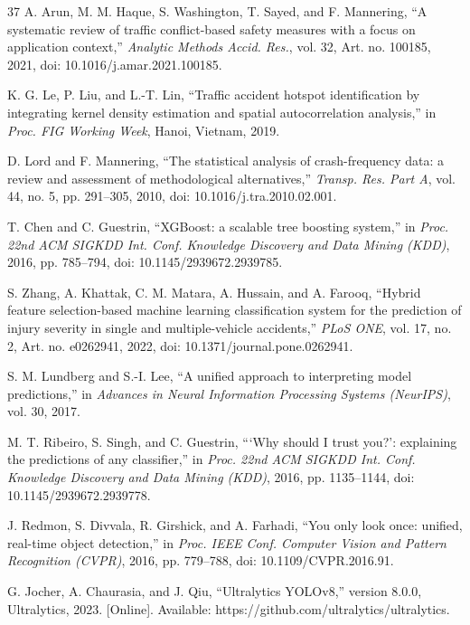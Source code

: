 \documentclass[journal]{IEEEtran}
\begin{document}
\begin{thebibliography}{37}
 A. Arun, M. M. Haque, S. Washington, T. Sayed, and F. Mannering, ``A systematic review of traffic conflict-based safety measures with a focus on application context,'' \emph{Analytic Methods Accid. Res.}, vol. 32, Art. no. 100185, 2021, doi: 10.1016/j.amar.2021.100185.

 K. G. Le, P. Liu, and L.-T. Lin, ``Traffic accident hotspot identification by integrating kernel density estimation and spatial autocorrelation analysis,'' in \emph{Proc. FIG Working Week}, Hanoi, Vietnam, 2019.

 D. Lord and F. Mannering, ``The statistical analysis of crash-frequency data: a review and assessment of methodological alternatives,'' \emph{Transp. Res. Part A}, vol. 44, no. 5, pp. 291--305, 2010, doi: 10.1016/j.tra.2010.02.001.

 T. Chen and C. Guestrin, ``XGBoost: a scalable tree boosting system,'' in \emph{Proc. 22nd ACM SIGKDD Int. Conf. Knowledge Discovery and Data Mining (KDD)}, 2016, pp. 785--794, doi: 10.1145/2939672.2939785.

 S. Zhang, A. Khattak, C. M. Matara, A. Hussain, and A. Farooq, ``Hybrid feature selection-based machine learning classification system for the prediction of injury severity in single and multiple-vehicle accidents,'' \emph{PLoS ONE}, vol. 17, no. 2, Art. no. e0262941, 2022, doi: 10.1371/journal.pone.0262941.

 S. M. Lundberg and S.-I. Lee, ``A unified approach to interpreting model predictions,'' in \emph{Advances in Neural Information Processing Systems (NeurIPS)}, vol. 30, 2017.

 M. T. Ribeiro, S. Singh, and C. Guestrin, ```Why should I trust you?': explaining the predictions of any classifier,'' in \emph{Proc. 22nd ACM SIGKDD Int. Conf. Knowledge Discovery and Data Mining (KDD)}, 2016, pp. 1135--1144, doi: 10.1145/2939672.2939778.

 J. Redmon, S. Divvala, R. Girshick, and A. Farhadi, ``You only look once: unified, real-time object detection,'' in \emph{Proc. IEEE Conf. Computer Vision and Pattern Recognition (CVPR)}, 2016, pp. 779--788, doi: 10.1109/CVPR.2016.91.

 G. Jocher, A. Chaurasia, and J. Qiu, ``Ultralytics YOLOv8,'' version 8.0.0, Ultralytics, 2023. [Online]. Available: https://github.com/ultralytics/ultralytics.


\end{thebibliography}
\end{document}

